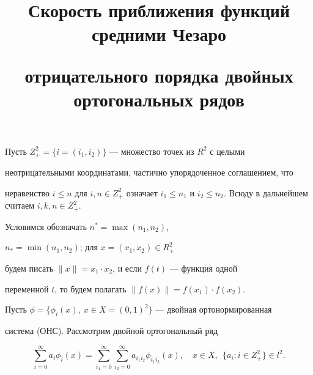 \title{Скорость приближения функций средними Чезаро


отрицательного порядка двойных ортогональных рядов}








\date{}




\pagestyle{plain} %







\maketitle


\label{begin}

















Пусть $Z ^2_+=\{ i=(i_1,i_2)\}$ --- множество точек из $R^2$ с целыми


неотрицательными координатами, частично упорядоченное соглашением, что


неравенство $i\le n$ для $i,n\in Z^2_+$ означает $i_1\le n_1$ и $i_2\le


n_2$. Всюду в дальнейшем считаем $i,k,n \in Z^2_+$.


Условимся обозначать $n^*=\max(n_1,n_2)$,


$n_*=\min(n_1,n_2)$; для $x=(x_1,x_2)\in R^2_+$


будем писать $\| x\| =x_1\cdot x_2$, и если $f(t)$ --- функция одной


переменной $t$, то будем полагать $\| f(x)\| =f(x_1)\cdot f(x_2)$.





Пусть $\phi=\{\phi_i(x),\ x\in X=(0,1)^2\}$ --- двойная ортонормированная 


система (ОНС). Рассмотрим двойной ортогональный ряд


\begin{equation}


\label{F1}


\sum_{i=0}^\infty a_i \phi_i (x)=\sum_{i_1= 0}^\infty \sum_{i_2= 0}^\infty


a_{i_1 i_2} \phi_{i_1 i_2} (x),\quad x\in X,\ \ \{a_i:i\in Z^2_+\} \in l^2 .


\end{equation}





